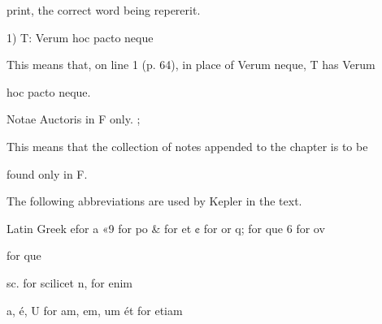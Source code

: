 \documentclass{article}
\begin{document}
print, the correct word being repererit.

1) T: Verum hoc pacto neque

This means that, on line 1 (p. 64), in place of Verum neque, T has Verum

hoc pacto neque.

Notae Auctoris in F only. ;

This means that the collection of notes appended to the chapter is to be

found only in F.

The following abbreviations are used by Kepler in the text.

Latin Greek
efor a «9 for po
& for et ¢ for or
q; for que 6 for ov

for que

sc. for scilicet
n, for enim

a, é, U for am, em, um
ét for etiam
\end{document}
